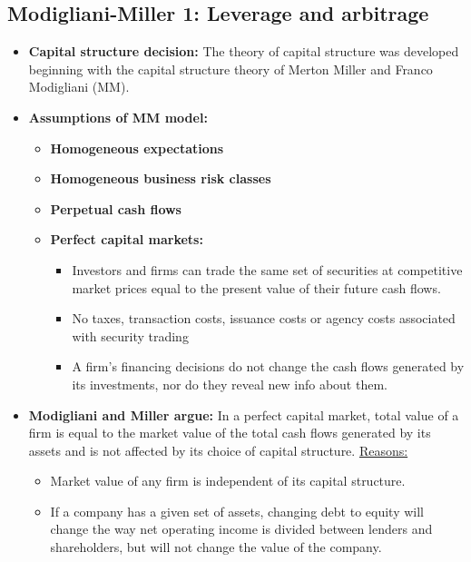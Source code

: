 \documentclass[ieeetran]{article}
\begin{document}
\subsection{Modigliani-Miller 1: Leverage and arbitrage} %
\label{sub:modigliani_miller_1_leverage_and_arbitrage}

\begin{itemize}
  \item \textbf{Capital structure decision:} The theory of capital structure was developed beginning with the capital structure theory of Merton Miller and Franco Modigliani (MM).

\item \textbf{Assumptions of MM model:}
	\begin{itemize}
	  \item \textbf{Homogeneous expectations}
		  \item \textbf{Homogeneous business risk classes}
	\item \textbf{Perpetual cash flows}
	\item \textbf{Perfect capital markets:}
		\begin{itemize}
		  \item Investors and firms can trade the same set of securities at competitive market prices equal to the present value of their future cash flows.
		\item No taxes, transaction costs, issuance costs or agency costs associated with security trading
		\item A firm's financing decisions do not change the cash flows generated by its investments, nor do they reveal new info about them.
		\end{itemize}
	\end{itemize}

\item \textbf{Modigliani and Miller argue:} In a perfect capital market, total value of a firm is equal to the market value of the total cash flows generated by its assets and is not affected by its choice of capital structure. \underline{Reasons:}
\begin{itemize}
  \item Market value of any firm is independent of its capital structure.
\item If a company has a given set of assets, changing debt to equity will change the way net operating income is divided between lenders and shareholders, but will not change the value of the company.
 
\end{itemize}


\end{itemize}
\end{document}

